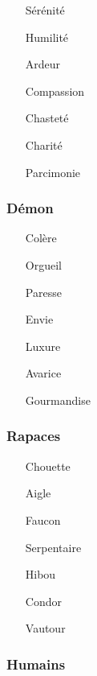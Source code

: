 \begin{itemize}
	\item[Sérénité] 
	\item[Humilité]
	\item[Ardeur]
	\item[Compassion]
	\item[Chasteté]
	\item[Charité]
	\item[Parcimonie]
\end{itemize}

\subsubsection{Démon}

\begin{itemize}
	\item[Colère]
	\item[Orgueil]
	\item[Paresse]
	\item[Envie]
	\item[Luxure]
	\item[Avarice]
	\item[Gourmandise]
\end{itemize}

\subsubsection{Rapaces}

\begin{itemize}
	\item[Chouette]
	\item[Aigle]
	\item[Faucon]
	\item[Serpentaire]
	\item[Hibou]
	\item[Condor]
	\item[Vautour]
\end{itemize}

\subsubsection{Humains}

